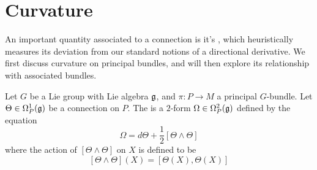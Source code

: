 %
\section{Curvature}
%
An important quantity associated to a connection is it's , which
heuristically measures its deviation from our standard notions of a directional
derivative. We first discuss curvature on principal bundles, and will then
explore its relationship with associated bundles.
%
\begin{defn}
Let $G$ be a Lie group with Lie algebra $\mathfrak{g}$, and $\pi : P \to M$ a principal $G$-bundle.
Let $\Theta \in \Omega_P^1(\mathfrak{g})$ be a connection on $P$. The  is
a $2$-form $\Omega \in \Omega_P^2(\mathfrak{g})$ defined by the equation
\[
\Omega = d\Theta + \frac{1}{2}[\Theta \wedge \Theta]
\]
where the action of $[\Theta \wedge \Theta]$ on $X$ is defined to be
\[
[\Theta \wedge \Theta](X) = [\Theta(X), \Theta(X)]
\]
\end{defn}
%